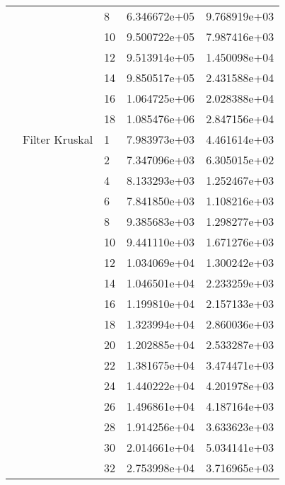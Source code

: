\begin{tabular}{lllrr}
                      &            & 8  &  6.346672e+05 &  9.768919e+03 \\
                      &            & 10 &  9.500722e+05 &  7.987416e+03 \\
                      &            & 12 &  9.513914e+05 &  1.450098e+04 \\
                      &            & 14 &  9.850517e+05 &  2.431588e+04 \\
                      &            & 16 &  1.064725e+06 &  2.028388e+04 \\
                      &            & 18 &  1.085476e+06 &  2.847156e+04 \\
                      & Filter Kruskal & 1  &  7.983973e+03 &  4.461614e+03 \\
                      &            & 2  &  7.347096e+03 &  6.305015e+02 \\
                      &            & 4  &  8.133293e+03 &  1.252467e+03 \\
                      &            & 6  &  7.841850e+03 &  1.108216e+03 \\
                      &            & 8  &  9.385683e+03 &  1.298277e+03 \\
                      &            & 10 &  9.441110e+03 &  1.671276e+03 \\
                      &            & 12 &  1.034069e+04 &  1.300242e+03 \\
                      &            & 14 &  1.046501e+04 &  2.233259e+03 \\
                      &            & 16 &  1.199810e+04 &  2.157133e+03 \\
                      &            & 18 &  1.323994e+04 &  2.860036e+03 \\
                      &            & 20 &  1.202885e+04 &  2.533287e+03 \\
                      &            & 22 &  1.381675e+04 &  3.474471e+03 \\
                      &            & 24 &  1.440222e+04 &  4.201978e+03 \\
                      &            & 26 &  1.496861e+04 &  4.187164e+03 \\
                      &            & 28 &  1.914256e+04 &  3.633623e+03 \\
                      &            & 30 &  2.014661e+04 &  5.034141e+03 \\
                      &            & 32 &  2.753998e+04 &  3.716965e+03 \\

\end{tabular}
